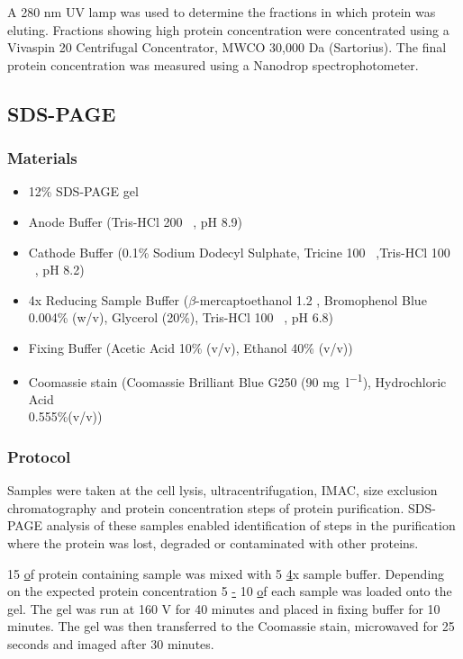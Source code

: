 A 280 nm UV lamp was used to determine the fractions in which protein was eluting. Fractions showing high protein concentration were concentrated using a Vivaspin 20 Centrifugal Concentrator, MWCO 30,000 \si{\dalton} (Sartorius). The final protein concentration was measured using a Nanodrop spectrophotometer.
\newpage
			\subsection*{SDS-PAGE}
			\subsubsection{Materials}
				\begin{itemize}
				\item 12\% SDS-PAGE gel				
				\item Anode Buffer (Tris-HCl 200 \si{\milli\molar}, pH 8.9) 
				\item Cathode Buffer (0.1\% Sodium Dodecyl Sulphate,  Tricine  100 \si{\milli\molar},Tris-HCl 100 \si{\milli\molar}, pH 8.2)
				\item 4x Reducing Sample Buffer ($\beta$-mercaptoethanol 1.2 \si{\molar}, Bromophenol Blue 0.004\% (w/v), Glycerol (20\%), Tris-HCl 100 \si{\milli\molar}, pH 6.8) 
				\item Fixing Buffer (Acetic Acid 10\% (v/v),  Ethanol 40\% (v/v))
				\item Coomassie stain (Coomassie Brilliant Blue G250 (90 \si{\milli\gram\per\litre}), Hydrochloric Acid \\0.555\%(v/v))  
				\end{itemize}
			\subsubsection{Protocol}Samples were taken at the cell lysis, ultracentrifugation, IMAC, size exclusion chromatography and protein concentration steps of protein purification. SDS-PAGE analysis of these samples enabled identification of steps in the purification where the protein was lost, degraded or contaminated with other proteins.\par

15 \ul of protein containing sample was mixed with 5 \ul  4x sample buffer. Depending on the expected protein concentration 5 \ul - 10 \ul of each sample was loaded onto the gel. The gel was run at 160 \si{\volt} for 40 minutes and placed in fixing buffer for 10 minutes. The gel was then transferred to the Coomassie stain, microwaved for 25 seconds and imaged after 30 minutes.
			

